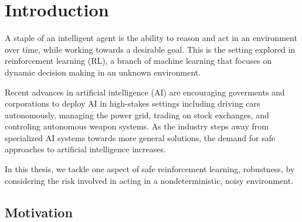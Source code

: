 \chapter{Introduction}\label{ch:introduction}
%

A staple of an intelligent agent is the ability to reason and act in an environment over time, while working towards a desirable goal. This is the setting explored in reinforcement learning (RL), a branch of machine learning that focuses on dynamic decision making in an unknown environment.

Recent advances in artificial intelligence (AI) are encouraging goverments and corporations to deploy AI in high-stakes settings including driving cars autonomously, managing the power grid, trading on stock exchanges, and controling autonomous weapon systems. As the industry steps away from specialized AI systems towards more general solutions, the demand for safe approaches to artificial intelligence increases.

In this thesis, we tackle one aspect of safe reinforcement learning, robustness, by considering the risk involved in acting in a nondeterministic, noisy environment.

\section{Motivation}

